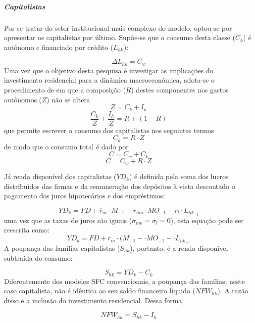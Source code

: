 \subparagraph*{Capitalistas}

Por se tratar do setor institucional mais complexo do modelo, optou-se por apresentar os capitalistas por último. Supõe-se que o consumo desta classe ($C_k$) é autônomo e financiado por crédito ($L_{hk}$):

\begin{equation}
\Delta L_{hk} = C_w
\end{equation}
Uma vez que o objetivo desta pesquisa é investigar as implicações do investimento residencial para a dinâmica macroeconômica, adota-se o procedimento de \textcite{freitas_baseline_2019} em que a composição ($R$) destes componentes nos gastos autônomos ($Z$) não se altera
\begin{equation}
\label{_Z}
Z = C_k + I_h
\end{equation}
$$
\frac{C_k}{Z} + \frac{I_h}{Z} = R + (1-R)
$$
que permite escrever o consumo dos capitalistas nos seguintes termos
\begin{equation}
\label{_Ck}
    C_k = R\cdot Z
\end{equation}
de modo que o consumo total é dado por
\begin{equation}
\label{ConsumoTotal}
C = C_w + C_k
\end{equation}
$$
C = C_w + R\cdot Z
$$

Já renda disponível dos capitalistas ($YD_k$) é definida pela soma dos lucros distribuídos das firmas e da remuneração dos depósitos à vista descontado o pagamento dos juros hipotecários e dos empréstimos:

\begin{equation}
    \label{EqYD}
    YD_k = FD + \overline r_m\cdot M_{-1} - r_{mo}\cdot MO_{-1} - r_{l}\cdot L_{hk_{-1}}
\end{equation}
uma vez que as taxas de juros são iguais ($\sigma_{mo} = \sigma_{l} = 0$), esta equação pode ser reescrita como:
$$
    YD_k = FD + \overline r_m\cdot (M_{-1} - \cdot MO_{-1} - \cdot L_{hk_{-1}}
$$
A poupança das famílias capitalistas ($S_{hk}$), portanto, é a renda disponível subtraída do consumo:

\begin{equation}
    \label{EqSh}
    S_{hk} = YD_k - C_k
\end{equation}
Diferentemente dos modelos SFC convencionais, a poupança das famílias, neste caso capitalista,  não é idêntica ao seu saldo financeiro líquido ($NFW_{hk}$). A razão disso é a inclusão do investimento residencial. Dessa forma, 

\begin{equation}
\label{NFWh}
    NFW_{hk} = S_{hk} - I_h
\end{equation}

